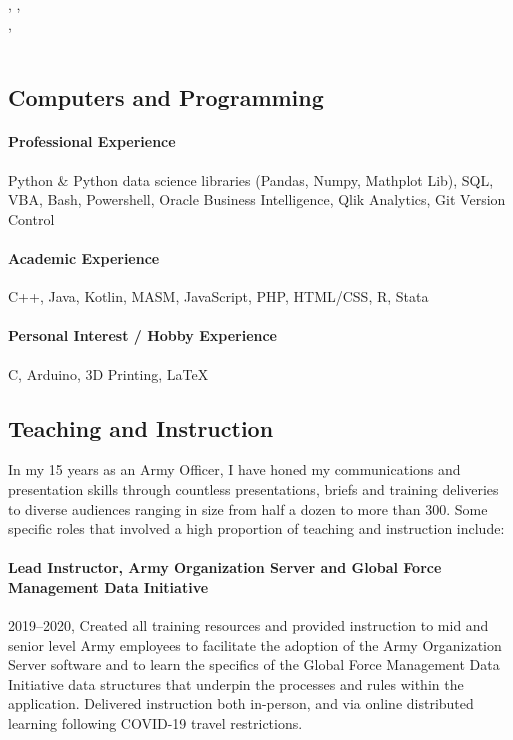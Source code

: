 \documentclass[12pt,letterpaper]{article}
\begin{document}
\paragraph{\DegreeCType} 
\DegreeCName \\
\DegreeCSchool , \DegreeCCity , \DegreeCState \\
\DegreeCHonors , \DegreeCDate \\
 \\
\DegreeCCourses

\subsection{Computers and Programming}
\paragraph{Professional Experience} Python \& Python data science libraries (Pandas, Numpy, Mathplot Lib), SQL, VBA, Bash, Powershell, Oracle Business Intelligence, Qlik Analytics, Git Version Control
\paragraph{Academic Experience} C++, Java, Kotlin, MASM, JavaScript, PHP, HTML/CSS, R, Stata
\paragraph{Personal Interest / Hobby Experience} C, Arduino, 3D Printing, LaTeX
\subsection{Teaching and Instruction}
In my 15 years as an Army Officer, I have honed my communications and presentation skills through countless presentations, briefs and training deliveries to diverse audiences ranging in size from half a dozen to more than 300. Some specific roles that involved a high proportion of teaching and instruction include:
\paragraph{Lead Instructor, Army Organization Server and Global Force Management Data Initiative} 2019--2020, Created all training resources and provided instruction to mid and senior level Army employees to facilitate the adoption of the Army Organization Server software and to learn the specifics of the Global Force Management Data Initiative data structures that underpin the processes and rules within the application. Delivered instruction both in-person, and via online distributed learning following COVID-19 travel restrictions.
\end{document}

